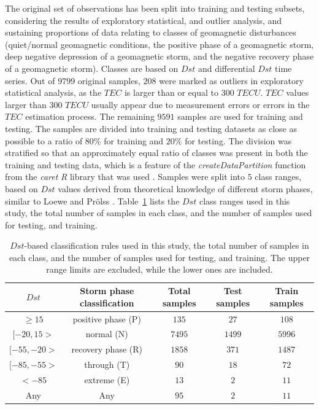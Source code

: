 \let\LaTeXcline\cline\documentclass[sn-mathphys-num]{sn-jnl}\let\cline\LaTeXcline
\begin{document}
The original set of observations has been split into training and testing subsets, considering the results of exploratory statistical, and outlier analysis, and sustaining proportions of data relating to classes of geomagnetic disturbances (quiet/normal geomagnetic conditions, the positive phase of a geomagnetic storm, deep negative depression of a geomagnetic storm, and the negative recovery phase of a geomagnetic storm). Classes are based on $Dst$ and differential $Dst$ time series. Out of $9799$ original samples, $208$ were marked as outliers in exploratory statistical analysis, as the $TEC$ is larger than or equal to $300$ $TECU$. $TEC$ values larger than $300$ $TECU$ usually appear due to measurement errors or errors in the $TEC$ estimation process. The remaining $9591$ samples are used for training and testing. The samples are divided into training and testing datasets as close as possible to a ratio of $80\%$ for training and $20\%$ for testing. The division was stratified so that an approximately equal ratio of classes was present in both the training and testing data, which is a feature of the \textit{createDataPartition} function from the \textit{caret} \textit{R} library that was used \cite{Kuhn2007, kuhn2008building}. Samples were split into $5$ class ranges, based on $Dst$ values derived from theoretical knowledge of different storm phases, similar to Loewe and Prölss \cite{loewe1997classification}. Table~\ref{tab:Dstranges} lists the $Dst$ class ranges used in this study, the total number of samples in each class, and the number of samples used for testing, and training.

\begin{table}[!ht]
    \centering
    \caption{$Dst$-based classification rules used in this study, the total number of samples in each class, and the number of samples used for testing, and training. The upper range limits are excluded, while the lower ones are included.}
    \label{tab:Dstranges}
    \begin{tabular}{|c|c|c|c|c|}
        \hline
        $Dst$ & Storm phase classification & Total samples & Test samples & Train samples \\ \hline
        $ \geq 15 $ & positive phase (P) & $135$ & $27$ & $108$ \\ \hline
        $[-20, 15>$ & normal (N) & $7495$ & $1499$ & $5996$ \\ \hline
        $[-55, -20>$ & recovery phase (R) & $1858$ & $371$ & $1487$ \\ \hline
        $[-85, -55>$ & through (T) & $90$ & $18$ & $72$ \\ \hline
        $ < -85$ & extreme (E) & $13$ & $2$ & $11$ \\ \hline
        Any & Any & $95$ & $2$ & $11$ \\ \hline
    \end{tabular}
\end{table}
\end{document}
